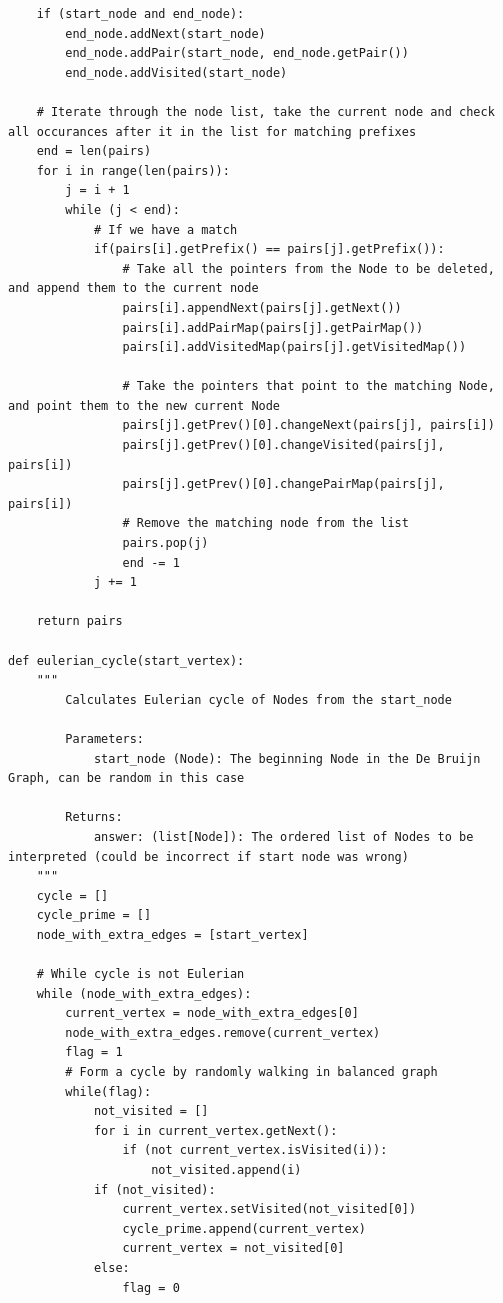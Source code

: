 \documentclass{article}
\begin{document}
\begin{lstlisting}
    if (start_node and end_node):
        end_node.addNext(start_node)
        end_node.addPair(start_node, end_node.getPair())
        end_node.addVisited(start_node)

    # Iterate through the node list, take the current node and check all occurances after it in the list for matching prefixes
    end = len(pairs)
    for i in range(len(pairs)):
        j = i + 1
        while (j < end):
            # If we have a match
            if(pairs[i].getPrefix() == pairs[j].getPrefix()):
                # Take all the pointers from the Node to be deleted, and append them to the current node
                pairs[i].appendNext(pairs[j].getNext())
                pairs[i].addPairMap(pairs[j].getPairMap())
                pairs[i].addVisitedMap(pairs[j].getVisitedMap())

                # Take the pointers that point to the matching Node, and point them to the new current Node
                pairs[j].getPrev()[0].changeNext(pairs[j], pairs[i])
                pairs[j].getPrev()[0].changeVisited(pairs[j], pairs[i])
                pairs[j].getPrev()[0].changePairMap(pairs[j], pairs[i])
                # Remove the matching node from the list
                pairs.pop(j)
                end -= 1
            j += 1

    return pairs

def eulerian_cycle(start_vertex):
    """
        Calculates Eulerian cycle of Nodes from the start_node

        Parameters:
            start_node (Node): The beginning Node in the De Bruijn Graph, can be random in this case

        Returns:
            answer: (list[Node]): The ordered list of Nodes to be interpreted (could be incorrect if start node was wrong)
    """
    cycle = []
    cycle_prime = []
    node_with_extra_edges = [start_vertex]

    # While cycle is not Eulerian
    while (node_with_extra_edges):
        current_vertex = node_with_extra_edges[0]
        node_with_extra_edges.remove(current_vertex)
        flag = 1
        # Form a cycle by randomly walking in balanced graph
        while(flag):
            not_visited = []
            for i in current_vertex.getNext():
                if (not current_vertex.isVisited(i)):
                    not_visited.append(i)
            if (not_visited):
                current_vertex.setVisited(not_visited[0])
                cycle_prime.append(current_vertex)
                current_vertex = not_visited[0]
            else:
                flag = 0


\end{lstlisting}
\end{document}
